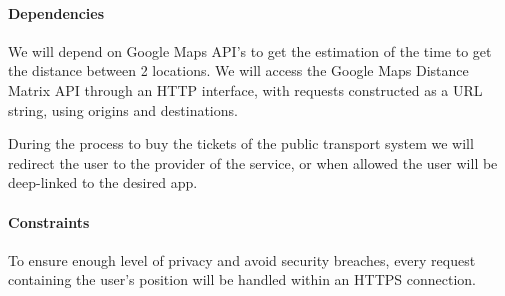 \paragraph{Dependencies}
\begin{description}
	\item We will depend on Google Maps API’s to get the estimation of the time to get the distance between 2 locations. 
	We will access the Google Maps Distance Matrix API through an HTTP interface, with requests constructed as a URL string, using origins and destinations.
	\item During the process to buy the tickets of the public transport system we will redirect the user to the provider of the service, or when allowed the user will be deep-linked to the desired app.
\end{description}


\paragraph{Constraints}
\begin{description}
	\item To ensure enough level of privacy and avoid security breaches, every request containing the user’s position will be handled within an HTTPS connection.
\end{description}
